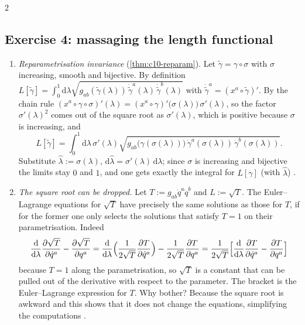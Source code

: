 \begin{paracol}{2}
\subsection*{Exercise 4: massaging the length functional}

\begin{enumerate}
  \item \emph{Reparametrisation invariance} (\cref{thm:c10-reparam}). Let $\tilde\gamma=\gamma\circ\sigma$ with $\sigma$ increasing, smooth and bijective. By definition $L[\tilde\gamma]=\int_0^1\mathrm d\lambda\sqrt{g_{ab}(\tilde\gamma(\lambda))\,\dot{\tilde\gamma}^a(\lambda)\,\dot{\tilde\gamma}^b(\lambda)}$ with $\dot{\tilde\gamma}^a=(x^a\circ\tilde\gamma)'$. By the chain rule $(x^a\circ\gamma\circ\sigma)'(\lambda)=(x^a\circ\gamma)'\bigl(\sigma(\lambda)\bigr)\,\sigma'(\lambda)$, so the factor $\sigma'(\lambda)^2$ comes out of the square root as $\sigma'(\lambda)$, which is positive because $\sigma$ is increasing, and
        \[
          L[\tilde\gamma]=\int_0^1\mathrm d\lambda\,\sigma'(\lambda)\sqrt{g_{ab}\bigl(\gamma(\sigma(\lambda))\bigr)\,\dot\gamma^a(\sigma(\lambda))\,\dot\gamma^b(\sigma(\lambda))}.
        \]
        Substitute $\hat\lambda:=\sigma(\lambda)$, $\mathrm d\hat\lambda=\sigma'(\lambda)\,\mathrm d\lambda$; since $\sigma$ is increasing and bijective the limits stay $0$ and $1$, and one gets exactly the integral for $L[\gamma]$ (with $\hat\lambda$) .
  \item \emph{The square root can be dropped.} Let $T:=g_{ab}\dot q^a\dot q^b$ and $L:=\sqrt T$. The Euler--Lagrange equations for $\sqrt T$ have precisely the same solutions as those for $T$, if for the former one only selects the solutions that satisfy $T=1$ on their parametrisation. Indeed
        \[
          \frac{\mathrm d}{\mathrm d\lambda}\frac{\partial\sqrt T}{\partial\dot q^a}-\frac{\partial\sqrt T}{\partial q^a}=\frac{\mathrm d}{\mathrm d\lambda}\Bigl(\frac1{2\sqrt T}\frac{\partial T}{\partial\dot q^a}\Bigr)-\frac1{2\sqrt T}\frac{\partial T}{\partial q^a}=\frac1{2\sqrt T}\Bigl[\frac{\mathrm d}{\mathrm d\lambda}\frac{\partial T}{\partial\dot q^a}-\frac{\partial T}{\partial q^a}\Bigr]
        \]
        because $T=1$ along the parametrisation, so $\sqrt T$ is a constant that can be pulled out of the derivative with respect to the parameter. The bracket is the Euler--Lagrange expression for $T$. Why bother? Because the square root is awkward and this shows that it does not change the equations, simplifying the computations .
\end{enumerate}


\end{paracol}
